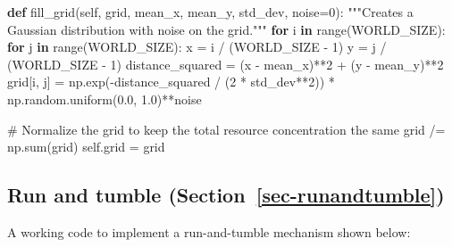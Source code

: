 \documentclass[
  letterpaper,
  DIV=11,
  numbers=noendperiod]{scrreprt}
\newenvironment{Shaded}{\begin{snugshade}}{\end{snugshade}}
\newcommand{\BuiltInTok}[1]{\textcolor[rgb]{0.00,0.23,0.31}{#1}}
\newcommand{\CommentTok}[1]{\textcolor[rgb]{0.37,0.37,0.37}{#1}}
\newcommand{\ControlFlowTok}[1]{\textcolor[rgb]{0.00,0.23,0.31}{\textbf{#1}}}
\newcommand{\DecValTok}[1]{\textcolor[rgb]{0.68,0.00,0.00}{#1}}
\newcommand{\FloatTok}[1]{\textcolor[rgb]{0.68,0.00,0.00}{#1}}
\newcommand{\KeywordTok}[1]{\textcolor[rgb]{0.00,0.23,0.31}{\textbf{#1}}}
\newcommand{\NormalTok}[1]{\textcolor[rgb]{0.00,0.23,0.31}{#1}}
\newcommand{\OperatorTok}[1]{\textcolor[rgb]{0.37,0.37,0.37}{#1}}
\newcommand{\VariableTok}[1]{\textcolor[rgb]{0.07,0.07,0.07}{#1}}
\theoremstyle{definition}
\theoremstyle{remark}
\begin{document}
\begin{Shaded}
\begin{Highlighting}[]
\KeywordTok{def}\NormalTok{ fill\_grid(}\VariableTok{self}\NormalTok{, grid, mean\_x, mean\_y, std\_dev, noise}\OperatorTok{=}\DecValTok{0}\NormalTok{):}
        \CommentTok{"""Creates a Gaussian distribution with noise on the grid."""}
        \ControlFlowTok{for}\NormalTok{ i }\KeywordTok{in} \BuiltInTok{range}\NormalTok{(WORLD\_SIZE):}
            \ControlFlowTok{for}\NormalTok{ j }\KeywordTok{in} \BuiltInTok{range}\NormalTok{(WORLD\_SIZE):}
\NormalTok{                x }\OperatorTok{=}\NormalTok{ i }\OperatorTok{/}\NormalTok{ (WORLD\_SIZE }\OperatorTok{{-}} \DecValTok{1}\NormalTok{)}
\NormalTok{                y }\OperatorTok{=}\NormalTok{ j }\OperatorTok{/}\NormalTok{ (WORLD\_SIZE }\OperatorTok{{-}} \DecValTok{1}\NormalTok{)}
\NormalTok{                distance\_squared }\OperatorTok{=}\NormalTok{ (x }\OperatorTok{{-}}\NormalTok{ mean\_x)}\OperatorTok{**}\DecValTok{2} \OperatorTok{+}\NormalTok{ (y }\OperatorTok{{-}}\NormalTok{ mean\_y)}\OperatorTok{**}\DecValTok{2}
\NormalTok{                grid[i, j] }\OperatorTok{=}\NormalTok{ np.exp(}\OperatorTok{{-}}\NormalTok{distance\_squared }\OperatorTok{/}\NormalTok{ (}\DecValTok{2} \OperatorTok{*}\NormalTok{ std\_dev}\OperatorTok{**}\DecValTok{2}\NormalTok{)) }\OperatorTok{*}\NormalTok{ np.random.uniform(}\FloatTok{0.0}\NormalTok{, }\FloatTok{1.0}\NormalTok{)}\OperatorTok{**}\NormalTok{noise}

        \CommentTok{\# Normalize the grid to keep the total resource concentration the same}
\NormalTok{        grid }\OperatorTok{/=}\NormalTok{ np.}\BuiltInTok{sum}\NormalTok{(grid)}
        \VariableTok{self}\NormalTok{.grid }\OperatorTok{=}\NormalTok{ grid}
\end{Highlighting}
\end{Shaded}

\subsection{\texorpdfstring{Run and tumble
(Section~\ref{sec-runandtumble})}{Run and tumble (Section~)}}\label{run-and-tumble-sec-runandtumble}

A working code to implement a run-and-tumble mechanism shown below:
\end{document}
